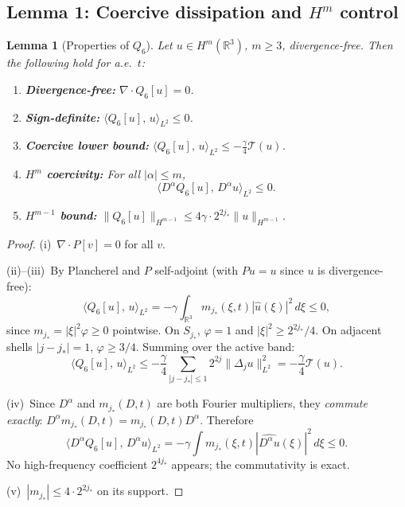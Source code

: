 \documentclass[12pt]{amsart}
\newtheorem{lemma}[theorem]{Lemma}
\theoremstyle{remark}
\newcommand{\R}{\mathbb{R}}
\newcommand{\Tcal}{\mathcal{T}}
\newcommand{\Qsix}{Q_6}
\newcommand{\ip}[2]{\langle #1,\, #2 \rangle}
\begin{document}
\subsection{Lemma 1: Coercive dissipation and $H^m$ control}

\begin{lemma}[Properties of $\Qsix$]\label{lem:Q6}
Let $u\in H^m(\R^3)$, $m\ge 3$, divergence-free.  Then the following
hold for a.e.\ $t$\textup{:}
\begin{enumerate}
  \item[\textup{(i)}]
    \textbf{Divergence-free:} $\nabla\cdot\Qsix[u]=0$.
  \item[\textup{(ii)}]
    \textbf{Sign-definite:} $\ip{\Qsix[u]}{u}_{L^2}\le 0$.
  \item[\textup{(iii)}]
    \textbf{Coercive lower bound:}
    $\ip{\Qsix[u]}{u}_{L^2}\le -\tfrac{\gamma}{4}\Tcal(u)$.
  \item[\textup{(iv)}]
    \textbf{$H^m$ coercivity:} For all $|\alpha|\le m$,
    \[
      \ip{D^\alpha\Qsix[u]}{D^\alpha u}_{L^2}\le 0.
    \]
  \item[\textup{(v)}]
    \textbf{$H^{m-1}$ bound:}
    $\|\Qsix[u]\|_{H^{m-1}}\le 4\gamma\cdot 2^{2j_*}\|u\|_{H^{m-1}}$.
\end{enumerate}
\end{lemma}

\begin{proof}
(i)~$\nabla\cdot P[v]=0$ for all $v$.

(ii)--(iii)~By Plancherel and $P$ self-adjoint (with $Pu=u$ since $u$
is divergence-free):
\[
  \ip{\Qsix[u]}{u}_{L^2}
  =-\gamma\int_{\R^3}m_{j_*}(\xi,t)|\hat u(\xi)|^2\,d\xi\le 0,
\]
since $m_{j_*}=|\xi|^2\varphi\ge 0$ pointwise.  On $S_{j_*}$,
$\varphi=1$ and $|\xi|^2\ge 2^{2j_*}/4$.  On adjacent shells
$|j-j_*|=1$, $\varphi\ge 3/4$.  Summing over the active band:
\[
  \ip{\Qsix[u]}{u}_{L^2}
  \le-\frac{\gamma}{4}\sum_{|j-j_*|\le 1}2^{2j}\|\Delta_ju\|_{L^2}^2
  =-\frac{\gamma}{4}\Tcal(u).
\]

(iv)~Since $D^\alpha$ and $m_{j_*}(D,t)$ are both Fourier multipliers,
they \emph{commute exactly}: $D^\alpha m_{j_*}(D,t)=m_{j_*}(D,t)D^\alpha$.
Therefore
\[
  \ip{D^\alpha\Qsix[u]}{D^\alpha u}_{L^2}
  =-\gamma\int m_{j_*}(\xi,t)|\widehat{D^\alpha u}(\xi)|^2\,d\xi\le 0.
\]
No high-frequency coefficient $2^{4j_*}$ appears; the commutativity
is exact.

(v)~$|m_{j_*}|\le 4\cdot 2^{2j_*}$ on its support.
\end{proof}
\end{document}
